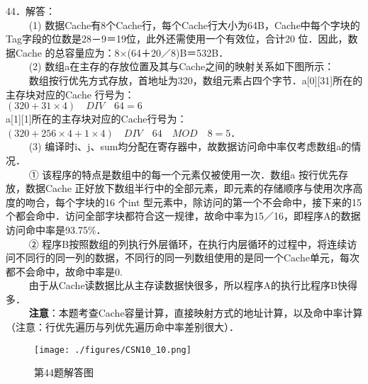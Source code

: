 44．解答：\\
$\qquad$ (1) 数据Cache有8个Cache行，每个Cache行大小为64B，Cache中每个字块的Tag字段的位数是28－9＝19位，此外还需使用一个有效位，合计20 位．因此，数据Cache 的总容量应为：8×(64＋20／8)B＝532B．\\
$\qquad$ (2) 数组a在主存的存放位置及其与Cache之间的映射关系如下图所示：\\
$\qquad$ 数组按行优先方式存放，首地址为320，数组元素占四个字节．a[0][31]所在的主存块对应的Cache 行号为：\\
$(320 + 31 \times 4) \quad DIV \quad 64 = 6$ \\
a[1][1]所在的主存块对应的Cache行号为： \\
$(320 + 256 \times 4 + 1 \times 4) \quad DIV \quad 64 \quad MOD \quad 8 = 5 $． \\
$\qquad$ (3) 编译时i、j、sum均分配在寄存器中，故数据访问命中率仅考虑数组a的情况． \\
$\qquad$ ① 该程序的特点是数组中的每一个元素仅被使用一次．数组a 按行优先存放，数据Cache 正好放下数组半行中的全部元素，即元素的存储顺序与使用次序高度的吻合，每个字块的16 个int 型元素中，除访问的第一个不会命中，接下来的15 个都会命中．访问全部字块都符合这一规律，故命中率为15／16，即程序A的数据访问命中率是93.75\%． \\
$\qquad$ ② 程序B按照数组的列执行外层循环，在执行内层循环的过程中，将连续访问不同行的同一列的数据，不同行的同一列数组使用的是同一个Cache单元，每次都不会命中，故命中率是0. \\
$\qquad$ 由于从Cache读数据比从主存读数据快很多，所以程序A的执行比程序B快得多．\\
$\qquad$ \textbf{注意}：本题考查Cache容量计算，直接映射方式的地址计算，以及命中率计算（注意：行优先遍历与列优先遍历命中率差别很大）．
\begin{figure}[ht]
\centering
\texttt{[image: ./figures/CSN10\_10.png]}
\caption{第44题解答图} \label{CSN10_fig10}
\end{figure}

